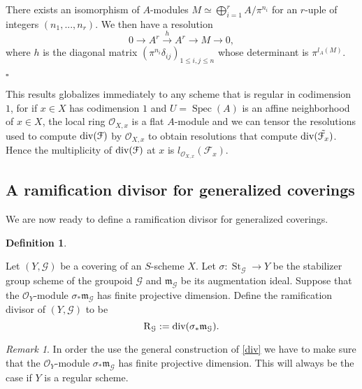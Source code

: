 \documentclass{amsart}
\newenvironment{demo}{{\flushleft \bf Proof~:}}{\hfill $\square$ \vspace{5mm}}
\theoremstyle{definition}
\newtheorem{defi}{Definition}[section]
\theoremstyle{remark}
\newtheorem*{rema}{Remark}
\begin{document}
\begin{demo}

There exists an isomorphism of $A$-modules $M \simeq \displaystyle\bigoplus\limits_{i=1}^r A/ \pi^{n_i}$ for an $r$-uple of integers $(n_1,...,n_r)$. We then have a resolution \[ 0 {\longrightarrow} A^r \stackrel{h}{\longrightarrow} A^r {\longrightarrow} M {\longrightarrow} 0, \] 
where $h$ is the diagonal matrix $(\pi^{n_i} \delta_{ij})_{1 \leq i,j \leq n}$ whose determinant is $\pi^{l_A(M)}$.

\end{demo}

This results globalizes immediately to any scheme that is regular in codimension $1$, for if $x \in X$ has codimension $1$ and $U = \operatorname{Spec}(A)$ is an affine neighborhood of $x \in X$, the local ring ${{\mathcal O}}_{X,x}$ is a flat $A$-module and we can tensor the resolutions used to compute $\textup{div}({{\mathcal F}})$ by ${{\mathcal O}}_{X,x}$ to obtain resolutions that compute $\textup{div}(\tilde{{{\mathcal F}}_x})$. Hence the multiplicity of $\textup{div}({{\mathcal F}})$ at $x$ is $l_{{{\mathcal O}}_{X,x}}({{\mathcal F}}_x)$.

\subsection{A ramification divisor for generalized coverings}

We are now ready to define a ramification divisor for generalized coverings.

\begin{defi}
\label{newdiv}

Let $(Y,{{\mathcal G}})$ be a covering of an $S$-scheme $X$. Let $\sigma : \operatorname{St}_{{\mathcal G}} {\longrightarrow} Y$ be the stabilizer group scheme of the groupoid ${{\mathcal G}}$ and ${{\mathfrak m}}_{{\mathcal G}}$ be its augmentation ideal. Suppose that the ${{\mathcal O}}_Y$-module $\sigma_* {{\mathfrak m}}_{{\mathcal G}}$ has finite projective dimension. Define the ramification divisor of $(Y,{{\mathcal G}})$ to be \[ \operatorname{R}_{{\mathcal G}} := \textup{div}(\sigma_* {{\mathfrak m}}_{{\mathcal G}}). \]

\end{defi}

\begin{rema}

In order the use the general construction of \ref{div} we have to make sure that the ${{\mathcal O}}_Y$-module $\sigma_* {{\mathfrak m}}_{{\mathcal G}}$ has finite projective dimension. This will always be the case if $Y$ is a regular scheme. 

\end{rema}
\end{document}
